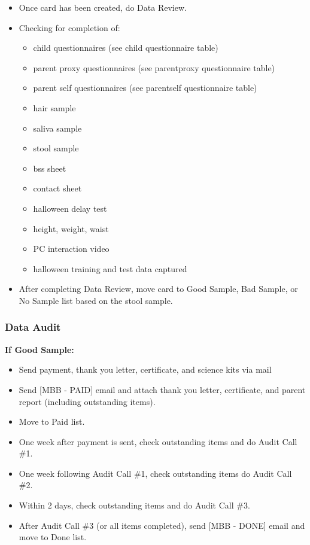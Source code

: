 \documentclass[]{book}
\providecommand{\tightlist}{%
  \setlength{\itemsep}{0pt}\setlength{\parskip}{0pt}}
\begin{document}
\begin{itemize}
\tightlist
\item
  Once card has been created, do Data Review.
\item
  Checking for completion of:

  \begin{itemize}
  \tightlist
  \item
    child questionnaires (see child questionnaire table)
  \item
    parent proxy questionnaires (see parentproxy questionnaire table)
  \item
    parent self questionnaires (see parentself questionnaire table)
  \item
    hair sample
  \item
    saliva sample
  \item
    stool sample
  \item
    bss sheet
  \item
    contact sheet
  \item
    halloween delay test
  \item
    height, weight, waist
  \item
    PC interaction video
  \item
    halloween training and test data captured
  \end{itemize}
\item
  After completing Data Review, move card to Good Sample, Bad Sample, or No Sample list based on the stool sample.
\end{itemize}

\hypertarget{data-audit}{%
\subsubsection{Data Audit}\label{data-audit}}

\textbf{If Good Sample:}

\begin{itemize}
\tightlist
\item
  Send payment, thank you letter, certificate, and science kits via mail
\item
  Send {[}MBB - PAID{]} email and attach thank you letter, certificate, and parent report (including outstanding items).
\item
  Move to Paid list.
\item
  One week after payment is sent, check outstanding items and do Audit Call \#1.
\item
  One week following Audit Call \#1, check outstanding items do Audit Call \#2.
\item
  Within 2 days, check outstanding items and do Audit Call \#3.
\item
  After Audit Call \#3 (or all items completed), send {[}MBB - DONE{]} email and move to Done list.
\end{itemize}
\end{document}
